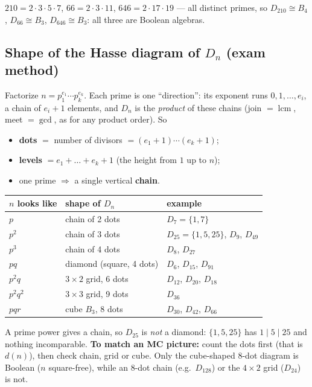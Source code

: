 \documentclass{fkt-notes}
\DeclareMathOperator{\lcm}{lcm}
\theoremstyle{definition}
\begin{document}
\begin{example}[6.4 Ex.~5: $D_{210}$, $D_{66}$, $D_{646}$]
  $210=2\cdot3\cdot5\cdot7$, $66=2\cdot3\cdot11$, $646=2\cdot17\cdot19$ ---
  all distinct primes, so $D_{210}\cong B_4$, $D_{66}\cong B_3$,
  $D_{646}\cong B_3$: all three are Boolean algebras.
\end{example}

\subsection{Shape of the Hasse diagram of $D_n$ (exam method)}
%
Factorize $n=p_1^{e_1}\cdots p_k^{e_k}$. Each prime is one ``direction'': its
exponent runs $0,1,\dots,e_i$, a chain of $e_i+1$ elements, and $D_n$ is the
\emph{product} of these chains (join $=\lcm$, meet $=\gcd$, as for any product
order). So
\begin{itemize}[nosep]
  \item \textbf{dots} $=$ number of divisors $=(e_1+1)\cdots(e_k+1)$;
  \item \textbf{levels} $=e_1+\dots+e_k+1$ (the height from $1$ up to $n$);
  \item one prime $\Rightarrow$ a single vertical \textbf{chain}.
\end{itemize}

\begin{center}
  \renewcommand{\arraystretch}{1.25}
  \begin{tabular}{@{}lll@{}}
    \toprule
    $n$ looks like & shape of $D_n$           & example                                \\
    \midrule
    $p$            & chain of 2 dots          & $D_{7}=\{1,7\}$                        \\
    $p^2$          & chain of 3 dots          & $D_{25}=\{1,5,25\}$, $D_{9}$, $D_{49}$ \\
    $p^3$          & chain of 4 dots          & $D_{8}$, $D_{27}$                      \\
    $pq$           & diamond (square, 4 dots) & $D_{6}$, $D_{15}$, $D_{91}$            \\
    $p^2q$         & $3\times2$ grid, 6 dots  & $D_{12}$, $D_{20}$, $D_{18}$           \\
    $p^2q^2$       & $3\times3$ grid, 9 dots  & $D_{36}$                               \\
    $pqr$          & cube $B_3$, 8 dots       & $D_{30}$, $D_{42}$, $D_{66}$           \\
    \bottomrule
  \end{tabular}
\end{center}
A prime power gives a chain, so $D_{25}$ is \emph{not} a diamond: $\{1,5,25\}$
has $1\mid5\mid25$ and nothing incomparable. \textbf{To match an MC picture:}
count the dots first (that is $d(n)$), then check chain, grid or cube. Only
the cube-shaped $8$-dot diagram is Boolean ($n$ square-free), while an
$8$-dot chain (e.g.\ $D_{128}$) or the $4\times2$ grid ($D_{24}$) is not.
\end{document}
